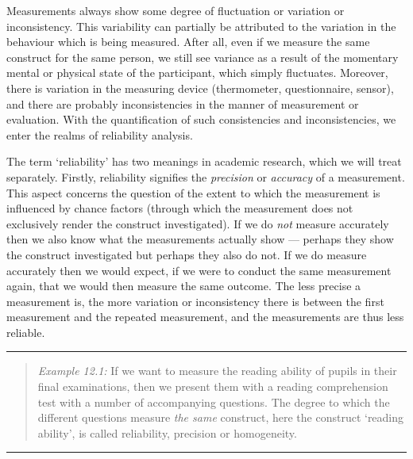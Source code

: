 \documentclass[
]{book}
\begin{document}
Measurements always show some degree of fluctuation or variation or
inconsistency. This variability can partially be attributed to the
variation in the behaviour which is being measured. After all, even if we
measure the same construct for the same person, we still see variance
as a result of the momentary mental or physical state of the participant,
which simply fluctuates. Moreover, there is variation in the measuring device
(thermometer, questionnaire, sensor), and there are probably inconsistencies in the manner
of measurement or evaluation. With the quantification of such consistencies and
inconsistencies, we enter the realms of reliability analysis.

The term `reliability' has two meanings in academic research, which we
will treat separately. Firstly, reliability signifies the \emph{precision}
or \emph{accuracy} of a measurement. This aspect concerns the question of the extent
to which the measurement is influenced by chance factors (through which the
measurement does not exclusively render the construct investigated).
If we do \emph{not} measure
accurately then we also know what the measurements actually show ---
perhaps they show the construct investigated but perhaps they also do not. If we do
measure accurately then we would expect, if we were to conduct the same measurement again,
that we would then measure the same outcome. The less precise a measurement is, the more variation or inconsistency there is between the first measurement and the repeated measurement,
and the measurements are thus less reliable.

\begin{center}\rule{0.5\linewidth}{0.5pt}\end{center}

\begin{quote}
\emph{Example 12.1:} If we want to measure the reading ability
of pupils in their final examinations, then we present them
with a reading comprehension test with a number of accompanying questions.
The degree to which the different questions measure \emph{the same} construct, here the
construct `reading ability', is called reliability, precision or
homogeneity.
\end{quote}

\begin{center}\rule{0.5\linewidth}{0.5pt}\end{center}
\end{document}

